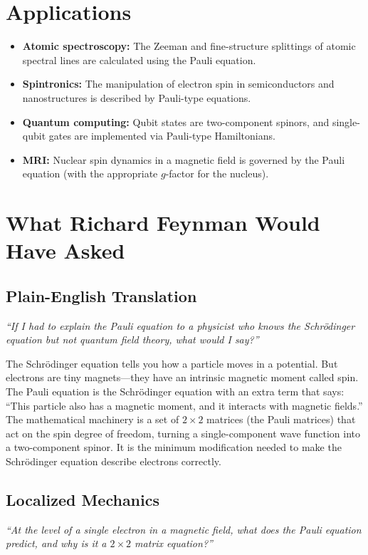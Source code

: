 \section*{Applications}

\begin{itemize}
  \item \textbf{Atomic spectroscopy:} The Zeeman and fine-structure splittings of atomic spectral lines are calculated using the Pauli equation.
  \item \textbf{Spintronics:} The manipulation of electron spin in semiconductors and nanostructures is described by Pauli-type equations.
  \item \textbf{Quantum computing:} Qubit states are two-component spinors, and single-qubit gates are implemented via Pauli-type Hamiltonians.
  \item \textbf{MRI:} Nuclear spin dynamics in a magnetic field is governed by the Pauli equation (with the appropriate $g$-factor for the nucleus).
\end{itemize}
\section*{What Richard Feynman Would Have Asked}

\subsection*{Plain-English Translation}
\textit{``If I had to explain the Pauli equation to a physicist who knows the Schrödinger equation but not quantum field theory, what would I say?''}

The Schrödinger equation tells you how a particle moves in a potential. But electrons are tiny magnets---they have an intrinsic magnetic moment called spin. The Pauli equation is the Schrödinger equation with an extra term that says: ``This particle also has a magnetic moment, and it interacts with magnetic fields.'' The mathematical machinery is a set of $2 \times 2$ matrices (the Pauli matrices) that act on the spin degree of freedom, turning a single-component wave function into a two-component spinor. It is the minimum modification needed to make the Schrödinger equation describe electrons correctly.

\subsection*{Localized Mechanics}
\textit{``At the level of a single electron in a magnetic field, what does the Pauli equation predict, and why is it a $2 \times 2$ matrix equation?''}

